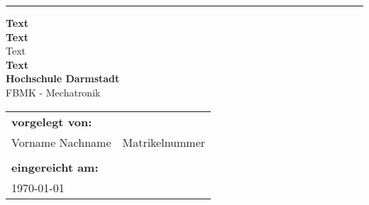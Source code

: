 %
%
\begin{titlepage}
	
	\begin{center}
		\rule{0.4\linewidth}{0.15\linewidth}\par
		\vspace{3cm}
	\end{center}
	
	
	
	\begin{flushleft}
		\LARGE{\textbf{Text }}\\[1.5ex]
		\Large{\textbf{Text}}\\[1ex]
		\large{Text}\\[4.5ex]
		
		\huge{\textbf{Text}}\\[2.5ex]
		
		\Large{\textbf{Hochschule Darmstadt}}\\[1ex]
		
		\large{FBMK - Mechatronik}\\[10ex]
		
		\hspace{-0.2cm}\begin{tabular}{ll}
			\textbf{vorgelegt von:}  & \\[1ex]
			Vorname Nachname & \quad Matrikelnummer\\
			& \\[1ex]
			\textbf{eingereicht am:} & \\[1ex]
			\today &  \\[1ex]
		\end{tabular}
		
	\end{flushleft}
\end{titlepage}